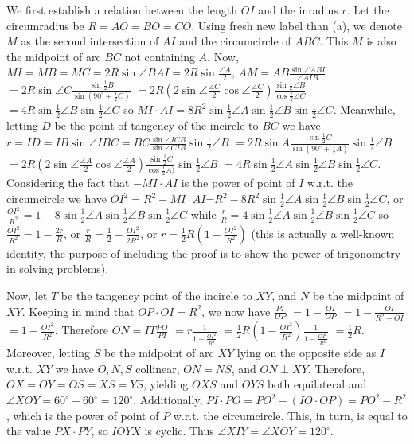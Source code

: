 \documentclass[11pt,a4paper]{article}
\begin{document}
\begin{itemize}
We first establish a relation between the length $OI$ and the inradius $r$. 
Let the circumradius be $R=AO=BO=CO$. Using fresh new label than (a), we denote $M$ as the second intersection of $AI$ and the circumcircle of $ABC$. 
This $M$ is also the midpoint of arc $BC$ not containing $A$. 
Now, $MI=MB=MC=2R\sin \angle BAI=2R\sin\frac{\angle A}{2}$, 
$AM=AB\frac{\sin\angle ABI}{\angle AIB}$
$=2R\sin\angle C \frac{\sin\frac 12 B}{\sin (90^{\circ}+\frac 12 C)}$
$=2R(2\sin\angle \frac{\angle C}{2} \cos\angle \frac{\angle C}{2}) \frac{\sin\frac 12 \angle B}{\cos\frac 12 \angle C}$
$=4R\sin\frac 12\angle B\sin\frac 12\angle C$
so $MI\cdot AI=8R^2\sin\frac 12 \angle A\sin\frac 12\angle B\sin\frac 12\angle C$. 
Meanwhile, letting $D$ be the point of tangency of the incircle to $BC$ we have 
$r=ID=IB\sin\angle IBC=BC\frac{\sin\angle ICB}{\sin\angle CIB}\sin\frac 12\angle B$
$=2R\sin A\frac{\sin\frac 12 C}{\sin (90^{\circ}+\frac 12 A)}\sin\frac 12\angle B$
$=2R(2\sin\angle \frac{\angle A}{2} \cos\angle \frac{\angle A}{2})\frac{\sin\frac 12 C}{\cos\frac 12 A)}\sin\frac 12\angle B$
$=4R\sin\frac 12 \angle A\sin\frac 12\angle B\sin\frac 12\angle C$. 
Considering the fact that $-MI\cdot AI$ is the power of point of $I$ w.r.t. the circumcircle we have 
$OI^2=R^2-MI\cdot AI$=$R^2-8R^2\sin\frac 12 \angle A\sin\frac 12\angle B\sin\frac 12\angle C$, 
or $\frac{OI^2}{R^2}=1-8\sin\frac 12 \angle A\sin\frac 12\angle B\sin\frac 12\angle C$ 
while $\frac {r}{R}=4\sin\frac 12 \angle A\sin\frac 12\angle B\sin\frac 12\angle C$ 
so $\frac{OI^2}{R^2}=1-\frac {2r}{R}$, 
or $\frac{r}{R}=\frac 12-\frac{OI^2}{2R^2}$, 
or $r=\frac 12R(1-\frac{OI^2}{R^2})$ 
(this is actually a well-known identity, the purpose of including the proof is to show the power of trigonometry in solving problems). 

Now, let $T$ be the tangency point of the incircle to $XY$, and $N$ be the midpoint of $XY$. 
Keeping in mind that $OP\cdot OI=R^2$, 
we now have $\frac{PI}{OP}$
$=1-\frac{OI}{OP}$
$=1-\frac{OI}{R^2\div OI}$
$=1-\frac{OI^2}{R^2}$. 
Therefore $ON=IT\frac{PO}{PI}$
$=r\frac{1}{1-\frac{OI^2}{R^2}}$
$=\frac 12 R(1-\frac{OI^2}{R^2})\frac{1}{1-\frac{OI^2}{R^2}}$
$=\frac 12 R$. 
Moreover, letting $S$ be the midpoint of arc $XY$ lying on the opposite side as $I$ w.r.t. $XY$ we have 
$O, N, S$ collinear, $ON=NS$, and $ON\perp XY$. 
Therefore, $OX=OY=OS=XS=YS$, 
yielding $OXS$ and $OYS$ both equilateral and 
$\angle XOY=60^{\circ}+60^{\circ}=120^{\circ}$. 
Additionally, $PI\cdot PO=PO^2-(IO\cdot OP)=PO^2-R^2$, 
which is the power of point of $P$ w.r.t. the circumcircle. 
This, in turn, is equal to the value $PX\cdot PY$, so $IOYX$ is cyclic. 
Thus $\angle XIY=\angle XOY=120^{\circ}$. 

\end{itemize}
\end{document}

